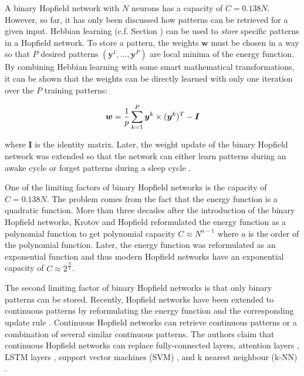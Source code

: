 A binary Hopfield network with \(N\) neurons has a capacity of \(C=0.138N\).
However, so far, it has only been discussed how patterns can be retrieved for a given input.
Hebbian learning (c.f. Section ) can be used to \emph{store} specific patterns in a Hopfield network.
To store a pattern, the weights \(\boldsymbol{w}\) must be chosen in a way so that $P$ desired patterns \((\boldsymbol{y}^1, ..., \boldsymbol{y}^P)\) are local minima of the energy function.
By combining Hebbian learning with some smart mathematical transformations, it can be shown that the weights can be directly learned with only one iteration over the $P$ training patterns:

\begin{align}\eqlbl{hf_5}
	\boldsymbol{w} = \frac{1}{p} \sum_{k=1}^{P} \boldsymbol{y}^k \times (\boldsymbol{y}^k)^T - \boldsymbol{I}
\end{align}

where \(\boldsymbol{I}\) is the identity matrix.
Later, the weight update of the binary Hopfield network was extended so that the network can either learn patterns during an awake cycle or forget patterns during a sleep cycle .

One of the limiting factors of binary Hopfield networks is the capacity of \(C=0.138N\).
The problem comes from the fact that the energy function is a quadratic function.
More than three decades after the introduction of the binary Hopfield networks, Krotov and Hopfield  reformulated the energy function as a polynomial function to get polynomial capacity \(C\approx N^{a-1}\) where \(a\) is the order of the polynomial function.
Later, the energy function was reformulated as an exponential function  and thus modern Hopfield networks have an exponential capacity of \(C\approx 2^{\frac{N}{2}}\).

The second limiting factor of binary Hopfield networks is that only binary patterns can be stored.
Recently, Hopfield networks have been extended to continuous patterns by reformulating the energy function and the corresponding update rule .
Continuous Hopfield networks can retrieve continuous patterns or a combination of several similar continuous patterns.
The authors claim that continuous Hopfield networks can replace fully-connected layers, attention layers \cite{10.5555/2969033.2969073}, LSTM layers \cite{Hochreiter_Schmidhuber_1997}, support vector machines (SVM) \cite{Cortes_Vapnik_1995}, and k nearest neighbour (k-NN) \cite{Cover_Hart_1967}.









